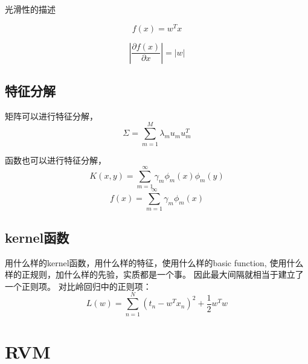 光滑性的描述

\begin{equation}
f(x) = w^Tx
\end{equation}

\begin{equation}
|\frac{\partial f(x)}{\partial x}| = |w|
\end{equation}

\subsection{特征分解}
矩阵可以进行特征分解，
\begin{equation} 
\Sigma = \sum_{m=1}^M\lambda_mu_mu^T_m
\end{equation}

函数也可以进行特征分解，
\begin{equation} 
K(x, y) = \sum_{m=1}^\infty\gamma_m\phi_m(x)\phi_m(y)
\end{equation}
\begin{equation} 
f(x) = \sum_{m=1}^\infty\gamma_m\phi_m(x)
\end{equation}

\subsection{kernel函数}
用什么样的kernel函数，用什么样的特征，使用什么样的basic function,
使用什么样的正规则，加什么样的先验，实质都是一个事。
因此最大间隔就相当于建立了一个正则项。
对比岭回归中的正则项：
\begin{equation}
L(w) = \sum_{n=1}^N(t_n - w^Tx_n)^2 + \frac{1}{2}w^Tw
\end{equation}

\section{RVM}
